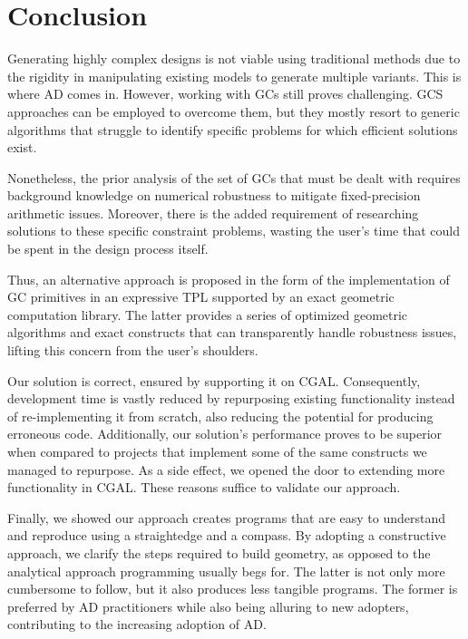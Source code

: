 \section{Conclusion}%
\label{sec:conclusion}

Generating highly complex designs is not viable using traditional
methods due to the rigidity in manipulating existing models to generate multiple
variants.  This is where \ac{AD} comes in.  However, working with \acp{GC} still
proves challenging.  \Ac{GCS} approaches can be employed to overcome them, but
they mostly resort to generic algorithms that struggle to identify specific
problems for which efficient solutions exist.

Nonetheless, the prior analysis of the set of \acp{GC} that must be dealt with
requires background knowledge on numerical robustness to mitigate
fixed-precision arithmetic issues.  Moreover, there is the added requirement of
researching solutions to these specific constraint problems,  wasting the user's
time that could be spent in the design process itself.

Thus, an alternative approach is proposed in the form of the implementation of
\ac{GC} primitives in an expressive \ac{TPL} supported by an exact geometric
computation library.  The latter provides a series of optimized geometric
algorithms and exact constructs that can transparently handle robustness issues,
lifting this concern from the user's shoulders.

Our solution is correct, ensured by supporting it on \ac{CGAL}.  Consequently,
development time is vastly reduced by repurposing existing functionality instead
of re-implementing it from scratch, also reducing the potential for producing
erroneous code.  Additionally, our solution's performance proves to be superior
when compared to projects that implement some of the same constructs we managed
to repurpose.  As a side effect, we opened the door to extending more
functionality in \ac{CGAL}.  These reasons suffice to validate our approach.

Finally, we showed our approach creates programs that are easy to understand and
reproduce using a straightedge and a compass.  By adopting a constructive
approach, we clarify the steps required to build geometry, as opposed to the
analytical approach programming usually begs for.  The latter is not only more
cumbersome to follow, but it also produces less tangible programs.  The former
is preferred by \ac{AD} practitioners while also being alluring to new adopters,
contributing to the increasing adoption of \ac{AD}.

